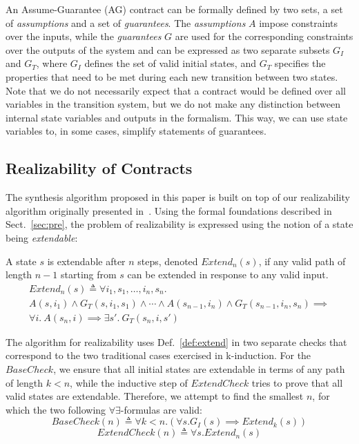 An Assume-Guarantee (AG) contract can be formally defined by two sets, a set of
\emph{assumptions} and a set of \emph{guarantees}. The \emph{assumptions} $A$
impose constraints over the inputs, while the \emph{guarantees} $G$ are used for
the corresponding constraints over the outputs of the system and can be expressed as
two separate subsets $G_I$ and $G_T$, where $G_I$ defines the set of valid
initial states, and $G_T$ specifies the properties that need to be met during
each new transition between two states. Note that we do not necessarily expect
that a contract would be defined over all variables in the transition system,
but we do not make any distinction between internal state variables and outputs in the formalism.
This way, we can use state variables to, in some cases, simplify statements of guarantees.

\subsection{Realizability of Contracts}
The synthesis algorithm proposed in this paper is built on top of our realizability algorithm
originally presented in~\cite{Katis15:Realizability}. Using the formal foundations described in Sect.~\ref{sec:pre},
the problem of realizability is expressed using the notion of a state being \emph{extendable}:

\begin{definition}
\label{def:extend}
A state $s$ is extendable after $n$ steps, denoted $\mathit{Extend}_{n}(s)$, if
any valid path of length $n-1$ starting from $s$ can be extended in response to
any valid input.%
%
\begin{multline*}%
\mathit{Extend}_{n}(s) \triangleq \forall i_1, s_1, \ldots, i_n, s_n.\\ A(s, i_1) \land G_T(s, i_1, s_1)
\land \cdots \land
A(s_{n-1}, i_n) \land G_T(s_{n-1}, i_n, s_n)
\implies \\
\forall i.~ A(s_n, i) \implies \exists s'.~ G_T(s_n, i, s')
\end{multline*}
\end{definition}

The algorithm for realizability uses Def.~\ref{def:extend} in two
separate checks that correspond to the two traditional cases exercised
in k-induction. For the $\mathit{BaseCheck}$, we ensure that all
initial states are extendable in terms of any path of length $k < n$,
while the inductive step of $\mathit{ExtendCheck}$ tries to prove that
all valid states are extendable. Therefore, we attempt to find the
smallest $n$, for which the two following $\forall\exists$-formulas
are valid:%
%
\begin{equation}
\label{eq:sbcheck}
\mathit{BaseCheck}(n) \triangleq \forall k < n. (\forall s. G_I(s)
	  	\implies \mathit{Extend}_k(s))
\end{equation}%
%
\begin{equation}
\label{eq:echeck}
\mathit{ExtendCheck}(n) \triangleq \forall s. \mathit{Extend}_n(s)
\end{equation}

